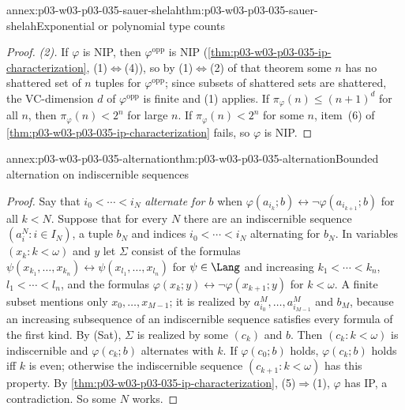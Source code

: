 \begin{annexitem}{annex:p03-w03-p03-035-sauer-shelah}{thm:p03-w03-p03-035-sauer-shelah}{Exponential or polynomial type counts}
\begin{proof}
\emph{(2).}  If \(\varphi\) is NIP, then \(\varphi^{\mathrm{opp}}\) is NIP
(\cref{thm:p03-w03-p03-035-ip-characterization}, (1)\(\Leftrightarrow\)(4)),
so by (1)\(\Leftrightarrow\)(2) of that theorem some \(n\) has no shattered
set of \(n\) tuples for \(\varphi^{\mathrm{opp}}\); since subsets of
shattered sets are shattered, the VC-dimension \(d\) of
\(\varphi^{\mathrm{opp}}\) is finite and (1) applies.  If
\(\pi_\varphi(n)\leq(n+1)^d\) for all \(n\), then \(\pi_\varphi(n)<2^n\) for
large \(n\).  If \(\pi_\varphi(n)<2^n\) for some \(n\), item~(6) of
\cref{thm:p03-w03-p03-035-ip-characterization} fails, so \(\varphi\) is NIP.
\end{proof}
\end{annexitem}

\begin{annexitem}{annex:p03-w03-p03-035-alternation}{thm:p03-w03-p03-035-alternation}{Bounded alternation on indiscernible sequences}
\begin{proof}
Say that \(i_0<\cdots<i_N\) \emph{alternate for \(b\)} when
\(\varphi(a_{i_k};b)\leftrightarrow\neg\varphi(a_{i_{k+1}};b)\) for all
\(k<N\).  Suppose that for every \(N\) there are an indiscernible sequence
\((a^N_i:i\in I_N)\), a tuple \(b_N\) and indices \(i_0<\cdots<i_N\)
alternating for \(b_N\).  In variables \((x_k:k<\omega)\) and \(y\) let
\(\Sigma\) consist of the formulas
\(\psi(x_{k_1},\ldots,x_{k_n})\leftrightarrow\psi(x_{l_1},\ldots,x_{l_n})\) for
\(\psi\in\Lang\) and increasing \(k_1<\cdots<k_n\), \(l_1<\cdots<l_n\), and the
formulas \(\varphi(x_k;y)\leftrightarrow\neg\varphi(x_{k+1};y)\) for
\(k<\omega\).  A finite subset mentions only \(x_0,\ldots,x_{M-1}\); it is
realized by \(a^M_{i_0},\ldots,a^M_{i_{M-1}}\) and \(b_M\), because an
increasing subsequence of an indiscernible sequence satisfies every formula
of the first kind.  By (Sat), \(\Sigma\) is realized by some \((c_k)\) and
\(b\).  Then \((c_k:k<\omega)\) is indiscernible and \(\varphi(c_k;b)\)
alternates with \(k\).  If \(\varphi(c_0;b)\) holds, \(\varphi(c_k;b)\) holds iff
\(k\) is even; otherwise the indiscernible sequence \((c_{k+1}:k<\omega)\) has
this property.  By \cref{thm:p03-w03-p03-035-ip-characterization},
(5)\(\Rightarrow\)(1), \(\varphi\) has IP, a contradiction.  So some \(N\)
works.


\end{proof}
\end{annexitem}
